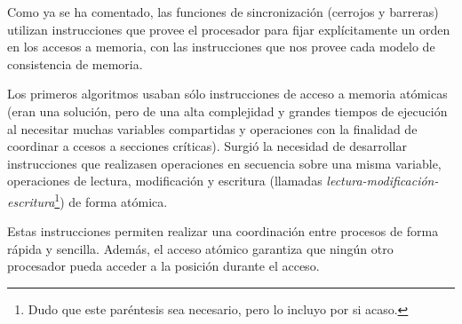 Como ya se ha comentado, las funciones de sincronización (cerrojos y barreras) utilizan instrucciones que provee el procesador para fijar explícitamente un orden en los accesos a memoria, con las instrucciones que nos provee cada modelo de consistencia de memoria.

Los primeros algoritmos usaban sólo instrucciones de acceso a memoria atómicas (eran una solución, pero de una alta complejidad y grandes tiempos de ejecución al necesitar muchas variables compartidas y operaciones con la finalidad de coordinar a ccesos a secciones críticas). Surgió la necesidad de desarrollar instrucciones que realizasen operaciones en secuencia sobre una misma variable, operaciones de lectura, modificación y escritura (llamadas \emph{lectura-modificación-escritura}\footnote{Dudo que este paréntesis sea necesario, pero lo incluyo por si acaso.}) de forma atómica.

Estas instrucciones permiten realizar una coordinación entre procesos de forma rápida y sencilla. Además, el acceso atómico garantiza que ningún otro procesador pueda acceder a la posición durante el acceso.\\

